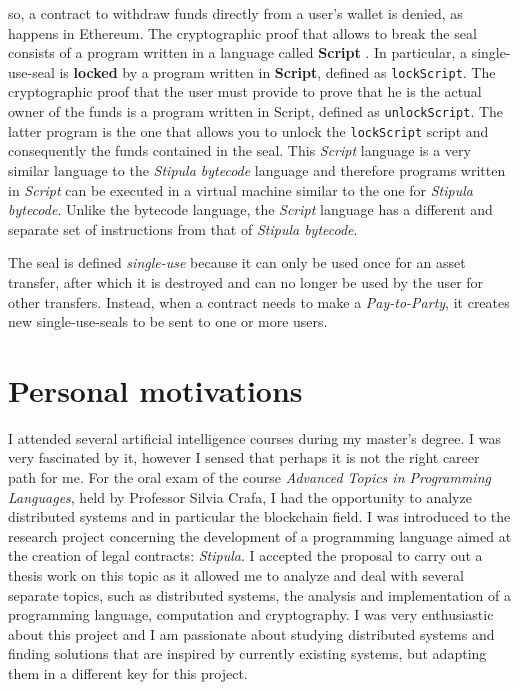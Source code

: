 so, a contract to withdraw funds directly from a user's wallet is denied, as happens in Ethereum. The 
cryptographic proof that allows to break the seal consists of a program written in a language called 
\textbf{Script} \autocite{book:mastering-bitcoin}. In particular, a single-use-seal is \textbf{locked} by 
a program written in \textbf{Script}, defined as \verb|lockScript|. The cryptographic proof that the user 
must provide to prove that he is the actual owner of the funds is a program written in Script, defined as 
\verb|unlockScript|. The latter program is the one that allows you to unlock the \verb|lockScript| script 
and consequently the funds contained in the seal. This \textit{Script} language is a very similar 
language to the \textit{Stipula bytecode} language and therefore programs written in \textit{Script} can 
be executed in a virtual machine similar to the one for \textit{Stipula bytecode}. Unlike the bytecode 
language, the \textit{Script} language has a different and separate set of instructions from that of 
\textit{Stipula bytecode}.

The seal is defined \textit{single-use} because it can only be used once for an asset transfer, after 
which it is destroyed and can no longer be used by the user for other transfers. Instead, when a contract 
needs to make a \textit{Pay-to-Party}, it creates new single-use-seals to be sent to one or more users.

\section{Personal motivations}

I attended several artificial intelligence courses during my master's degree. I was very fascinated by it, 
however I sensed that perhaps it is not the right career path for me. For the oral exam of the course 
\textit{Advanced Topics in Programming Languages}, held by Professor Silvia Crafa, I had the opportunity to 
analyze distributed systems and in particular the blockchain field. I was introduced to the research 
project concerning the development of a programming language aimed at the creation of legal contracts: 
\textit{Stipula}. I accepted the proposal to carry out a thesis work on this topic as it allowed me to 
analyze and deal with several separate topics, such as distributed systems, the analysis and implementation 
of a programming language, computation and cryptography. I was very enthusiastic about this project and I 
am passionate about studying distributed systems and finding solutions that are inspired by currently 
existing systems, but adapting them in a different key for this project.

